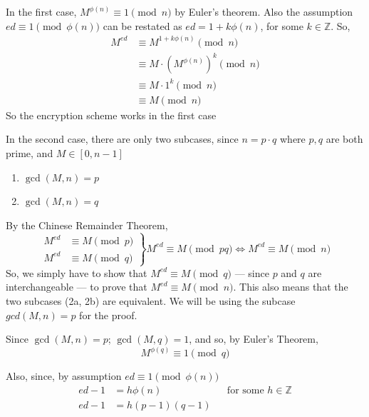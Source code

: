 \documentclass[12pt, titlepage]{article}
\begin{document}
        In the first case, $M^{\phi(n)} \equiv 1 \pmod{n}$ by Euler's theorem. Also the
        assumption $ed \equiv 1 \pmod{\phi(n)}$ can be restated as $ed = 1 + k\phi(n)$, for
        some $k \in \mathbb{Z}$. So, 
        \begin{align*}
            M^{ed} &\equiv M^{1 + k\phi(n)} \pmod{n} \\
                   &\equiv M \cdot (M^{\phi(n)})^k  \pmod{n} \\
                   &\equiv M \cdot 1^k \pmod{n} \\
                   &\equiv M \pmod{n}
        \end{align*}
        So the encryption scheme works in the first case

        In the second case, there are only two subcases, since $n = p \cdot q$ where $p, q$
        are both prime, and $ M \in \left[0, n-1\right]$
        \renewcommand{\labelenumi}{2\alph{enumi}.}
        \begin{enumerate}
            \item $\gcd(M, n) = p$
            \item $\gcd(M, n) = q$
        \end{enumerate}
        
        By the Chinese Remainder Theorem,
        \begin{equation*}
            \left.
                \begin{aligned}
                    M^{ed} &\equiv M \pmod{p}\\
                    M^{ed} &\equiv M \pmod{q}
                \end{aligned}
            \right\}
            M^{ed} \equiv M \pmod{pq} \iff M^{ed} \equiv M \pmod{n}
        \end{equation*}
        So, we simply have to show that $M^{ed} \equiv M \pmod{q}$ --- since $p$ and $q$ are
        interchangeable --- to prove that $M^{ed} \equiv M \pmod{n}$. This also means that
        the two subcases (2a, 2b) are equivalent. We will be using the subcase $gcd(M, n) =
        p$ for the proof.
        
        Since $\gcd(M, n) = p$; $\gcd(M, q) = 1$, and so, by Euler's Theorem,
        \begin{equation} \label{eq:M-q-euler} 
            M^{\phi(q)} \equiv 1 \pmod{q} 
        \end{equation}

        Also, since, by assumption $ed \equiv 1 \pmod{\phi(n)}$
        \begin{align*}
            ed - 1 &= h\phi(n) &&\text{for some } h \in \mathbb{Z}\\
            ed - 1 &= h(p-1)(q-1)
        \end{align*}
\end{document}
